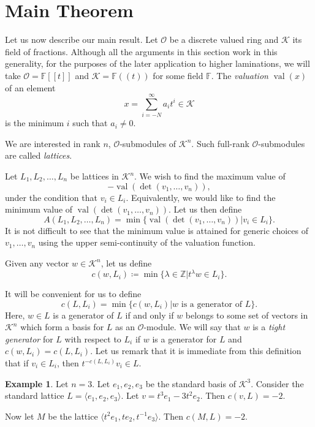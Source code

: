 \documentclass[10pt]{amsart}
\theoremstyle{definition}
\newtheorem{example}[theorem]{Example}
\newcommand{\F}{\mathbb{F}}
\newcommand{\Z}{\mathbb{Z}}
\newcommand{\cO}{\mathcal{O}}
\newcommand{\cK}{\mathcal{K}}
\newcommand{\val}{\operatorname{val}}
\begin{document}
\section{Main Theorem}\label{sect4}

Let us now describe our main result. Let $\cO$ be a discrete valued ring and $\cK$ its field of fractions. Although all the arguments in this section work in this generality, for the purposes of the later application to higher laminations, we will take $\cO=\F[[t]]$ and $\cK=\F((t))$ for some field $\F$. The \emph{valuation} $\val(x)$ of an element 
\[
x = \sum_{i=-N}^{\infty} a_i t^i \in \cK
\]
 is the minimum $i$ such that $a_i \neq 0$. 

We are interested in rank $n$, $\cO$-submodules of $\cK^n$. Such full-rank $\cO$-submodules are called {\it lattices}.

Let $L_1, L_2, \dots, L_n$ be lattices in $\cK^n$. We wish to find the maximum value of
\[
-\val(\det(v_1, \dots, v_n)),
\]
under the condition that $v_i \in L_i$. Equivalently, we would like to find the minimum value of $\val(\det(v_1, \dots, v_n)).$ Let us then define 
\[
A(L_1, L_2, \dots, L_n) = \min \{\val(\det(v_1, \dots, v_n)) | v_i \in L_i\}.
\]
It is not difficult to see that the minimum value is attained for generic choices of $v_1, \dots, v_n$ using the upper semi-continuity of the valuation function.

Given any vector $w \in \cK^n$, let us define 
\[
c(w,L_i) \coloneqq  \min\{\lambda \in \Z | t^{\lambda}w \in L_i \}.
\]

It will be convenient for us to define
\[
c(L,L_i) = \min \{ c(w,L_i) | w \text{ is a generator of } L \}.
\]
Here, $w \in L$ is a generator of $L$ if and only if $w$ belongs to some set of vectors in $\cK^n$ which form a basis for $L$ as an $\cO$-module. We will say that $w$ is a \emph{tight generator} for $L$ with respect to $L_i$ if $w$ is a generator for $L$ and $c(w,L_i)=c(L,L_i)$. Let us remark that it is immediate from this definition that if $v_i \in L_i$, then $t^{-c(L,L_i)}v_i \in L$.

\begin{example} Let $n=3$. Let $e_1, e_2, e_3$ be the standard basis of $\cK^3$. Consider the standard lattice $L= \langle e_1, e_2, e_3\rangle .$ Let $v=t^3e_1 -3t^2 e_2$. Then $c(v, L)= -2$.

Now let $M$ be the lattice $\langle t^2e_1, te_2, t^{-1}e_3\rangle $. Then $c(M,L) = -2$.

\end{example}
\end{document}

